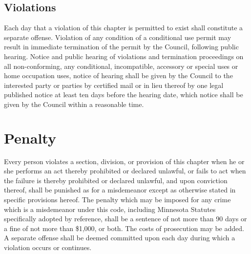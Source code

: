 \subsection{Violations} Each day that a violation of this chapter is permitted to exist shall constitute a separate offense. Violation of any condition of a conditional use permit may result in immediate termination of the permit by the Council, following public hearing. Notice and public hearing of violations and termination proceedings on all non-conforming, any conditional, incompatible, accessory or special uses or home occupation uses, notice of hearing shall be given by the Council to the interested party or parties by certified mail or in lieu thereof by one legal published notice at least ten days before the hearing date, which notice shall be given by the Council within a reasonable time.

\setcounter{section}{998}
\section{Penalty}
Every person violates a section, division, or provision of this chapter when he or she performs an act thereby prohibited or declared unlawful, or fails to act when the failure is thereby prohibited or declared unlawful, and upon conviction thereof, shall be punished as for a misdemeanor except as otherwise stated in specific provisions hereof. The penalty which may be imposed for any crime which is a misdemeanor under this code, including Minnesota Statutes specifically adopted by reference, shall be a sentence of not more than 90 days or a fine of not more than \$1,000, or both.  The costs of prosecution may be added. A separate offense shall be deemed committed upon each day during which a violation occurs or continues.

